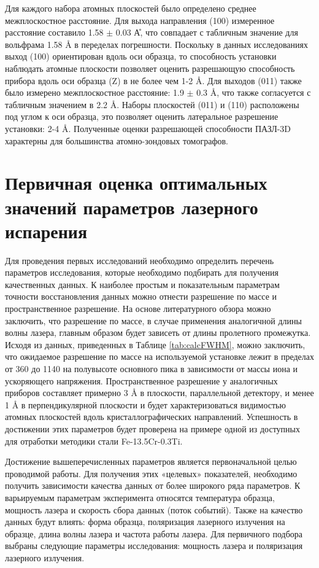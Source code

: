 Для каждого набора атомных плоскостей было определено среднее межплоскостное расстояние. Для выхода направления (100) измеренное расстояние составило 1.58 $\pm$ 0.03 \r{А}, что совпадает с табличным значение для вольфрама 1.58 \r{A} в переделах погрешности. Поскольку в данных исследованиях выход (100) ориентирован вдоль оси образца, то способность установки наблюдать атомные плоскости позволяет оценить разрешающую способность прибора вдоль оси образца (Z) в не более чем 1-2 \r{A}. Для выходов (011) также было измерено межплоскостное расстояние: 1.9 $\pm$ 0.3 \r{A}, что также согласуется с табличным значением в 2.2 \r{A}. Наборы плоскостей (011) и (110) расположены под углом к оси образца, это позволяет оценить латеральное разрешение установки: 2-4 \r{A}. Полученные оценки разрешающей способности ПАЗЛ-3D  характерны для большинства атомно-зондовых томографов. 

\FloatBarrier

\section{Первичная оценка оптимальных значений параметров лазерного испарения}\label{sec:ch3/sect2}

Для проведения первых исследований необходимо определить перечень параметров исследования, которые необходимо подбирать для получения качественных данных. К наиболее простым и показательным параметрам точности восстановления данных можно отнести разрешение по массе и пространственное разрешение. На основе литературного обзора можно заключить, что разрешение по массе, в случае применения аналогичной длины волны лазера, главным образом будет зависеть от длины пролетного промежутка. Исходя из данных, приведенных в Таблице \cref{tab:calcFWHM}, можно заключить, что ожидаемое разрешение по массе на используемой установке лежит в пределах от 360 до 1140 на полувысоте основного пика в зависимости от массы иона и ускоряющего напряжения. Пространственное разрешение у аналогичных приборов составляет примерно 3 \r{A} в плоскости, параллельной детектору, и менее 1 \r{A} в перпендикулярной плоскости и будет характеризоваться видимостью атомных плоскостей вдоль кристаллографических направлений. Успешность в достижении этих параметров будет проверена на примере одной из доступных для отработки методики стали Fe-13.5Cr-0.3Ti.

Достижение вышеперечисленных параметров является первоначальной целью проводимой работы. Для получения этих «целевых» показателей, необходимо получить зависимости качества данных от более широкого ряда параметров. К варьируемым параметрам эксперимента относятся температура образца, мощность лазера и скорость сбора данных (поток событий). Также на качество данных будут влиять: форма образца, поляризация лазерного излучения на образце, длина волны лазера и частота работы лазера. Для первичного подбора выбраны следующие параметры исследования: мощность лазера и поляризация лазерного излучения.

